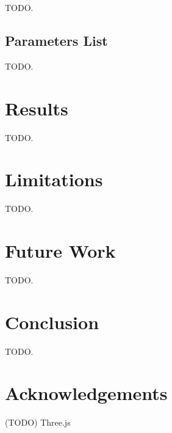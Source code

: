 \documentclass[conference]{acmsiggraph}
\begin{document}
TODO.

\subsection{Parameters List}

TODO.

\section{Results}

TODO.

\section{Limitations}

TODO.

\section{Future Work}

TODO.

\section{Conclusion}

TODO.

\section*{Acknowledgements}

(TODO) Three.js



\end{document}
